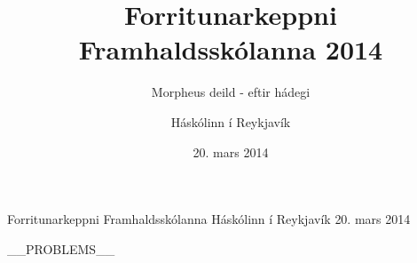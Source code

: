 \documentclass[11pt,a4paper,oneside]{article}
\title{Forritunarkeppni Framhaldsskólanna 2014}
\subtitle{Morpheus deild - eftir hádegi}
\date{20. mars 2014}
\author{Háskólinn í Reykjavík}
\newcommand{\problemstatement}[1]{  }
\begin{document}

	\maketitle
	\thispagestyle{empty}
	\pagebreak

	\contest
	{Forritunarkeppni Framhaldsskólanna}%
	{Háskólinn í Reykjavík}%
	{20. mars 2014}%

    __PROBLEMS__

\end{document}
